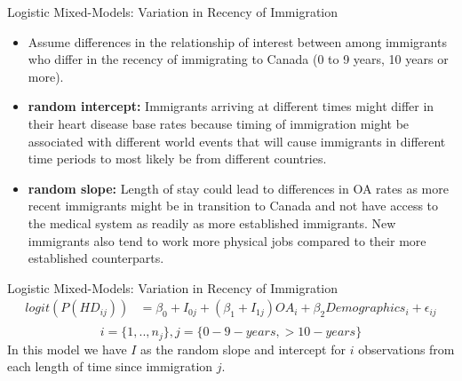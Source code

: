 \begin{frame}{Logistic Mixed-Models: Variation in Recency of Immigration}
\begin{itemize}
    \item Assume differences in the relationship of interest between among immigrants who differ in the recency of immigrating to Canada (0 to 9 years, 10 years or more).
    \item \textbf{random intercept: }Immigrants arriving at different times might differ in their heart disease base rates because timing of immigration might be associated with different world events that will cause immigrants in different time periods to most likely be from different countries.
    \item \textbf{random slope: }Length of stay could lead to differences in OA rates as more recent immigrants might be in transition to Canada and not have access to the medical system as readily as more established immigrants. New immigrants also tend to work more physical jobs compared to their more established counterparts.
\end{itemize}

\end{frame}
\begin{frame}{Logistic Mixed-Models: Variation in Recency of Immigration}
    \begin{align*}
    logit(P(HD_{ij}))&=\beta_0+I_{0j}+(\beta_1+I_{1j})OA_i +\beta_2Demographics_i+\epsilon_{ij}\\
\end{align*}
\begin{equation*}
    i=\{1,..,n_j\}, j=\{0-9-years, >10-years\}
\end{equation*}
In this model we have $I$ as the random slope and intercept for $i$ observations from each length of time since immigration $j$.
\end{frame}
